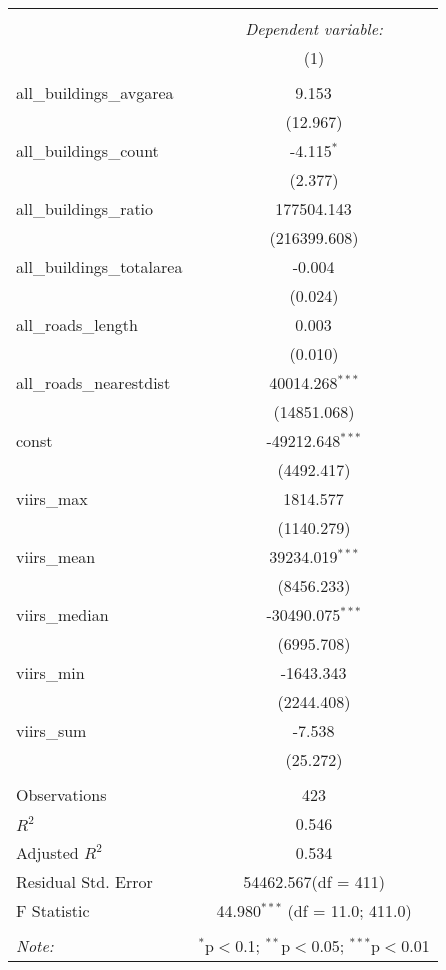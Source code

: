 \begin{table}[!htbp] \centering
\begin{tabular}{@{\extracolsep{5pt}}lc}
\\[-1.8ex]\hline
\hline \\[-1.8ex]
& \multicolumn{1}{c}{\textit{Dependent variable:}} \
\cr \cline{1-2}
\\[-1.8ex] & (1) \\
\hline \\[-1.8ex]
 all_buildings_avgarea & 9.153$^{}$ \\
  & (12.967) \\
 all_buildings_count & -4.115$^{*}$ \\
  & (2.377) \\
 all_buildings_ratio & 177504.143$^{}$ \\
  & (216399.608) \\
 all_buildings_totalarea & -0.004$^{}$ \\
  & (0.024) \\
 all_roads_length & 0.003$^{}$ \\
  & (0.010) \\
 all_roads_nearestdist & 40014.268$^{***}$ \\
  & (14851.068) \\
 const & -49212.648$^{***}$ \\
  & (4492.417) \\
 viirs_max & 1814.577$^{}$ \\
  & (1140.279) \\
 viirs_mean & 39234.019$^{***}$ \\
  & (8456.233) \\
 viirs_median & -30490.075$^{***}$ \\
  & (6995.708) \\
 viirs_min & -1643.343$^{}$ \\
  & (2244.408) \\
 viirs_sum & -7.538$^{}$ \\
  & (25.272) \\
\hline \\[-1.8ex]
 Observations & 423 \\
 $R^2$ & 0.546 \\
 Adjusted $R^2$ & 0.534 \\
 Residual Std. Error & 54462.567(df = 411)  \\
 F Statistic & 44.980$^{***}$ (df = 11.0; 411.0) \\
\hline
\hline \\[-1.8ex]
\textit{Note:} & \multicolumn{1}{r}{$^{*}$p$<$0.1; $^{**}$p$<$0.05; $^{***}$p$<$0.01} \\
\end{tabular}
\end{table}